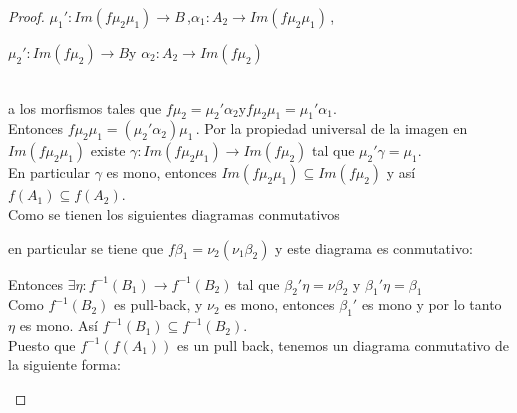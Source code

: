 \documentclass{article}
\begin{document}
\begin{enumerate}[label=\textbf{Ej \arabic*.}]
\begin{proof}
			\centerline{
				$\mu_1':Im(f\mu_2\mu_1)\to B$\,,\qquad $\alpha_1:A_2\to Im(f\mu_2\mu_1)$\,,}
			
			\centerline{
				$\mu_2':Im(f\mu_2)\to B$\quad y \quad $\alpha_2:A_2\to Im(f\mu_2)$
			}
			
			\,\\ a los morfismos tales que $f\mu_2=\mu_2'\alpha_2$\quad y\quad $f\mu_2\mu_1=\mu_1'\alpha_1$.\\
			Entonces $f\mu_2\mu_1=(\mu_2'\alpha_2)\mu_1\,.$ Por la propiedad universal de la imagen en $Im(f\mu_2\mu_1)$ existe 
			$\gamma : Im(f\mu_2\mu_1)\to Im(f\mu_2)$ tal que $\mu_2'\gamma=\mu_1$.\\
			En particular $\gamma$ es mono, entonces $Im(f\mu_2\mu_1)\subseteq Im(f\mu_2)$ y así \\$f(A_1)\subseteq f(A_2)$.\\
			
			 Como se tienen los siguientes diagramas conmutativos\\
			
			\centerline{
				}
			
			en particular se tiene que $f\beta_1=\nu_2(\nu_1\beta_2)$ y este diagrama es conmutativo:\\
			
			\centerline{
				}
			
			Entonces $\exists \eta : f^{-1}(B_1)\to f^{-1}(B_2)$ tal que $\beta_2'\eta=\nu\beta_2$\,\,y\,\,$\beta_1'\eta=\beta_1$\\
			
			Como $f^{-1}(B_2)$ es pull-back, y $\nu_2$ es mono, entonces $\beta_1'$ es mono y por lo tanto $\eta$ es mono. Así $f^{-1}(B_1)\subseteq f^{-1}(B_2)$.
			\\
			
			 Puesto que $f^{-1}(f(A_1))$ es un pull back, tenemos un diagrama conmutativo de la siguiente forma:\\
			
			\centerline{
				}
			

\end{proof}
\end{enumerate}
\end{document}
